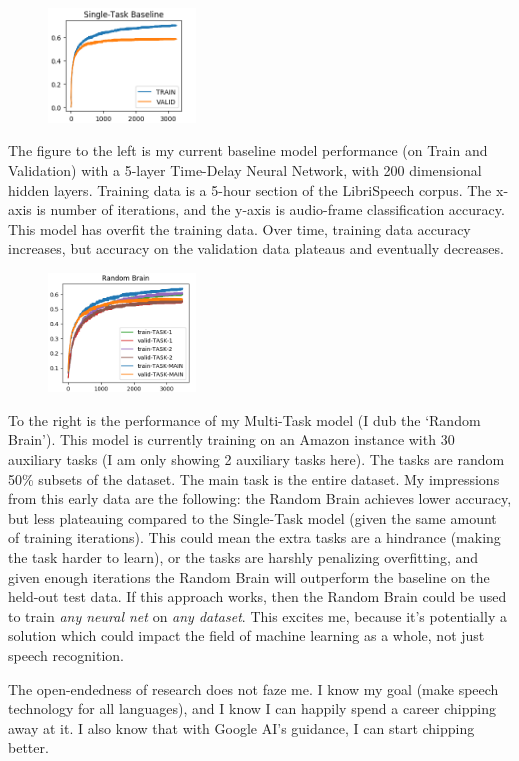 \documentclass[12pt,a4paper]{article}
\begin{document}
\begin{figure}
\centering
\includegraphics[width=0.35\textwidth]{figs/stl.png}
\end{figure}

The figure to the left is my current baseline model performance (on Train and Validation) with a 5-layer Time-Delay Neural Network, with 200 dimensional hidden layers. Training data is a 5-hour section of the LibriSpeech corpus. The x-axis is number of iterations, and the y-axis is audio-frame classification accuracy. This model has overfit the training data. Over time, training data accuracy increases, but accuracy on the validation data plateaus and eventually decreases. 


\begin{figure}
  \centering
  \includegraphics[width=0.35\textwidth]{figs/mtl.png}
\end{figure}

To the right is the performance of my Multi-Task model (I dub the `Random Brain'). This model is currently training on an Amazon instance with 30 auxiliary tasks (I am only showing 2 auxiliary tasks here). The tasks are random 50\% subsets of the dataset. The main task is the entire dataset. My impressions from this early data are the following: the Random Brain achieves lower accuracy, but less plateauing compared to the Single-Task model (given the same amount of training iterations). This could mean the extra tasks are a hindrance (making the task harder to learn), or the tasks are harshly penalizing overfitting, and given enough iterations the Random Brain will outperform the baseline on the held-out test data. If this approach works, then the Random Brain could be used to train \textit{any neural net} on \textit{any dataset}. This excites me, because it's potentially a solution which could impact the field of machine learning as a whole, not just speech recognition.


The open-endedness of research does not faze me. I know my goal (make speech technology for all languages), and I know I can happily spend a career chipping away at it. I also know that with Google AI's guidance, I can start chipping better.
\end{document}
